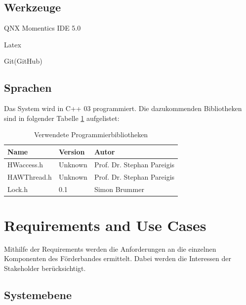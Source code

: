\documentclass[a4paper, 11pt]{article}
\begin{document}
\subsection{Werkzeuge}
\begin{compactenum}[-]
\item QNX Momentics IDE 5.0
\item Latex
\item Git(GitHub)
\end{compactenum}

\subsection{Sprachen}
Das System wird in C++ 03 programmiert. Die dazukommenden Bibliotheken sind in folgender Tabelle \ref{bibl} aufgelistet:
\medskip
\begin{table}[h]
\center
\begin{tabular}{|l|l|l|}
\hline
\textbf{Name}&\textbf{Version}&\textbf{Autor}\\
\hline
HWaccess.h&Unknown&Prof. Dr. Stephan Pareigis\\
\hline
HAWThread.h&Unknown&Prof. Dr. Stephan Pareigis \\
\hline
Lock.h&0.1&Simon Brummer \\
\hline
\end{tabular}
\caption{Verwendete Programmierbibliotheken}
\label{bibl}
\end{table}

\newpage

\section{Requirements and Use Cases}
Mithilfe der Requirements werden die Anforderungen an die einzelnen Komponenten des Förderbandes ermittelt. Dabei werden die Interessen der Stakeholder berücksichtigt.
\subsection{Systemebene}
\end{document}
